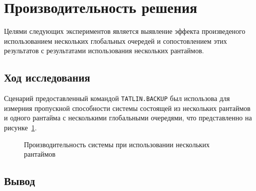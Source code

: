 \section{Производительность решения}

Целями следующих экспериментов является выявление эффекта произведеного использованием нескольких глобальных очередей и сопостовлением этих результатов с результатами использования нескольких рантаймов.

\subsection{Ход исследования}

Сценарий предоставленный командой \verb|TATLIN.BACKUP| был использова для измерния пропускной способности системы состоящей из нескольких рантаймов и одного рантайма с несколькими глобальными очередями, что представленно на рисунке~\ref{fig:tatlin:multi_rt_gp:eval}.

\begin{figure}[H]
    \begin{center}
    \end{center}

    \caption{Производительность системы при использовании нескольких рантаймов}
    \label{fig:tatlin:multi_rt_gp:eval}
\end{figure}

\subsection{Вывод}

